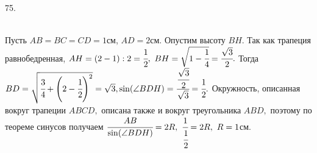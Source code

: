 75. \begin{figure}[ht!]
\end{figure}\\
Пусть $AB=BC=CD=1$см, $AD=2$см. Опустим высоту $BH.$ Так как трапеция равнобедренная, $AH=(2-1):2=\cfrac{1}{2},\ BH=\sqrt{1-\cfrac{1}{4}}=\cfrac{\sqrt{3}}{2}.$ Тогда $BD=\sqrt{\cfrac{3}{4}+\left(2-\cfrac{1}{2}\right)^2}=\sqrt{3}, \sin(\angle BDH)=\cfrac{\cfrac{\sqrt{3}}{2}}{\sqrt{3}}=\cfrac{1}{2}.$ Окружность, описанная вокруг трапеции $ABCD,$ описана также и вокруг треугольника $ABD,$ поэтому по теореме синусов получаем $\cfrac{AB}{\sin(\angle BDH)}=2R,\ \cfrac{1}{\cfrac{1}{2}}=2R,\ R=1$см.\\
